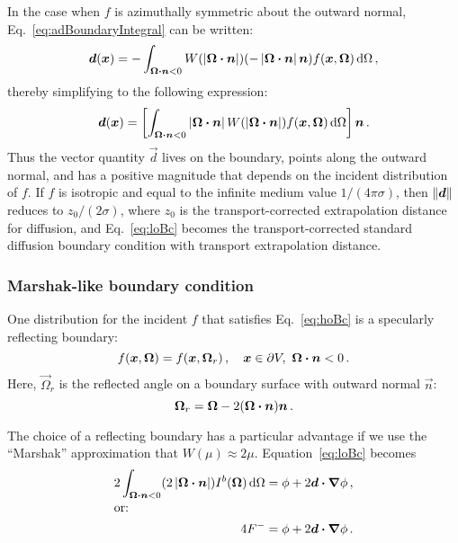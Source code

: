 In the case when $f$ is azimuthally symmetric about the outward normal,
Eq.~\eqref{eq:adBoundaryIntegral} can be written:
\begin{equation*}
  \bm{d}(\bm{x}) = -\int_{\bm{\Omega}\bm{\cdot}\bm{n} < 0} W(\left| \bm{\Omega}\bm{\cdot}\bm{n} \right|)
  (-\left|  \bm{\Omega} \bm{\cdot} \bm{n} \right| \bm{n})
  f(\bm{x}, \bm{\Omega}) \mathop{}\!\mathrm{d}\Omega\,,
\end{equation*}
thereby simplifying to the following expression:
\begin{equation} \label{eq:adBoundaryIntegral2}
  \bm{d}(\bm{x})
  = \left[ \int_{\bm{\Omega}\bm{\cdot}\bm{n} < 0}
  \left| \bm{\Omega}\bm{\cdot}\bm{n} \right| W(\left| \bm{\Omega}\bm{\cdot}\bm{n} \right|)
  f(\bm{x}, \bm{\Omega}) \mathop{}\!\mathrm{d}\Omega\right] \bm{n}\,.
\end{equation}
Thus the vector quantity $\vec{d}$ lives on the boundary, points along the
outward normal, and has a positive magnitude that depends on the incident
distribution of $f$. If $f$ is isotropic and equal to the infinite medium value
$1/(4\pi\sigma)$, then $\left\| \bm{d} \right\|$ reduces to $z_0 / (2 \sigma)$, where
$z_0$ is the transport-corrected extrapolation distance for diffusion,
and Eq.~\eqref{eq:loBc} becomes the transport-corrected standard diffusion
boundary condition with transport extrapolation distance.

\subsubsection{Marshak-like boundary condition}

One distribution for the incident $f$ that satisfies
Eq.~\eqref{eq:hoBc} is a specularly reflecting boundary:
\begin{equation} \label{eq:zetaReflecting}
  f(\bm{x}, \bm{\Omega}) = f(\bm{x}, \bm{\Omega}_r) \,,
 \quad \bm{x} \in \partial V, \ \bm{\Omega} \bm{\cdot} \bm{n} < 0 \,.
\end{equation}
Here, $\vec{\Omega}_r$ is the reflected angle on a boundary surface with outward
normal $\vec{n}$:
\begin{equation} \label{eq:reflection}
  \bm{\Omega}_r = \bm{\Omega} - 2(\bm{\Omega} \bm{\cdot} \bm{n}) \bm{n}\,.
\end{equation}

The choice of a reflecting boundary has a particular advantage if we use the
``Marshak'' approximation
that $W(\mu)\approx 2\mu$. Equation~\eqref{eq:loBc} becomes
\begin{align*}
  2\int_{\bm{\Omega}\bm{\cdot} \bm{n} < 0}
  ( 2\left| \bm{\Omega} \bm{\cdot} \bm{n} \right| ) I^b(\bm{\Omega}) \mathop{}\!\mathrm{d}\Omega
  &= \phi
  + 2\bm{d} \bm{\cdot} \bm{\nabla} \phi \,,
  \\ \intertext{or:}
  4 F^-
  &= \phi
  + 2\bm{d} \bm{\cdot} \bm{\nabla} \phi \,.
\end{align*}

